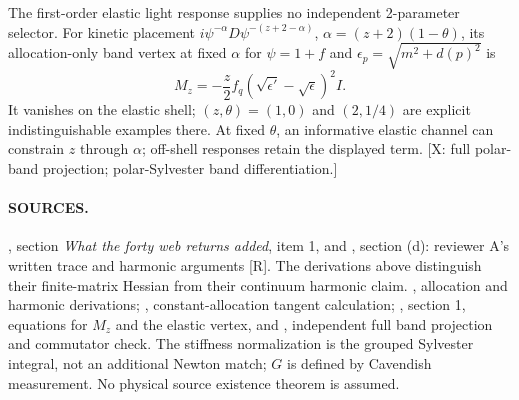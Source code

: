 The first-order elastic light response supplies no independent
2-parameter selector.
For kinetic placement
$i\psi^{-\alpha}D\psi^{-(z+2-\alpha)}$,
$\alpha=(z+2)(1-\theta)$, its allocation-only band vertex at fixed
$\alpha$ for $\psi=1+f$ and
$\epsilon_p=\sqrt{m^2+d(p)^2}$ is
\[
 M_z=-\frac z2 f_q(\sqrt{\epsilon'}-\sqrt{\epsilon})^2 I .
\]
It vanishes on the elastic shell; $(z,\theta)=(1,0)$ and
$(2,1/4)$ are explicit indistinguishable examples there.
At fixed $\theta$, an informative elastic channel can constrain $z$
through $\alpha$; off-shell responses retain the displayed term.
[X: full polar-band projection; polar-Sylvester band differentiation.]

\paragraph*{SOURCES.}
\begingroup\footnotesize
{},
section \emph{What the forty web returns added}, item 1, and
,
section (d): reviewer A's written trace and harmonic arguments [R].
The derivations above distinguish their finite-matrix Hessian from
their continuum harmonic claim.
,
allocation and harmonic derivations;
,
constant-allocation tangent calculation;
,
section 1, equations for $M_z$ and the elastic vertex, and
,
independent full band projection and commutator check.
The stiffness normalization is the grouped Sylvester integral,
not an additional Newton match; $G$ is defined by Cavendish measurement.
No physical source existence theorem is assumed.
\endgroup

